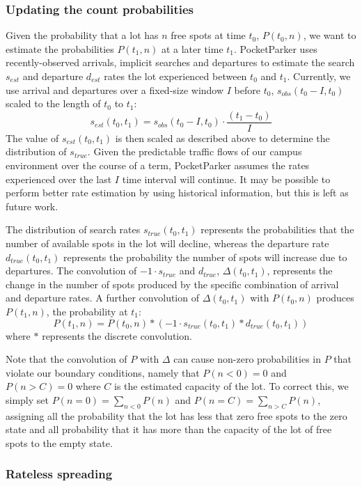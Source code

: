 \subsubsection{Updating the count probabilities}

Given the probability that a lot has $n$ free spots at time $t_0$, $P(t_0,
n)$, we want to estimate the probabilities $P(t_1, n)$ at a later time $t_1$.
PocketParker uses recently-observed arrivals, implicit searches and
departures to estimate the search $s_{est}$ and departure $d_{est}$ rates the
lot experienced between $t_0$ and $t_1$. Currently, we use arrival and
departures over a fixed-size window $I$ before $t_0$, $s_{obs}(t_0 -
I, t_0)$ scaled to the length of $t_0$ to $t_1$:
%
\[s_{est}(t_0, t_1) = s_{obs}(t_0 - I, t_0) \cdot \frac{(t_1 - t_0)}{I} \]
%
The value of $s_{est}(t_0, t_1)$ is then scaled as described above to
determine the distribution of $s_{true}$.  Given the predictable traffic flows
of our campus environment over the course of a term, PocketParker assumes the
rates experienced over the last $I$ time interval will continue. It may be
possible to perform better rate estimation by using historical information,
but this is left as future work.

The distribution of search rates $s_{true}(t_0, t_1)$ represents the
probabilities that the number of available spots in the lot will decline,
whereas the departure rate $d_{true}(t_0, t_1)$ represents the probability
the number of spots will increase due to departures. The convolution of $-1
\cdot s_{true}$ and $d_{true}$, $\Delta(t_0, t_1)$, represents the change in
the number of spots produced by the specific combination of arrival and
departure rates. A further convolution of $\Delta(t_0, t_1)$ with $P(t_0,
n)$ produces $P(t_1, n)$, the probability at $t_1$:
%
\[ P(t_1, n) = P(t_0, n) * (-1 \cdot s_{true}(t_0, t_1) * d_{true}(t_0,
t_1)) \]
%
where $*$ represents the discrete convolution.

Note that the convolution of $P$ with $\Delta$ can cause non-zero
probabilities in $P$ that violate our boundary conditions, namely that
$P(n < 0) = 0$ and $P(n > C) = 0$ where $C$ is the estimated capacity of
the lot. To correct this, we simply set $P(n = 0) = \sum_{n < 0} P(n)$
and $P(n = C) = \sum_{n > C} P(n)$, assigning all the probability that
the lot has less that zero free spots to the zero state and all probability
that it has more than the capacity of the lot of free spots to the empty
state.

\subsubsection{Rateless spreading}

